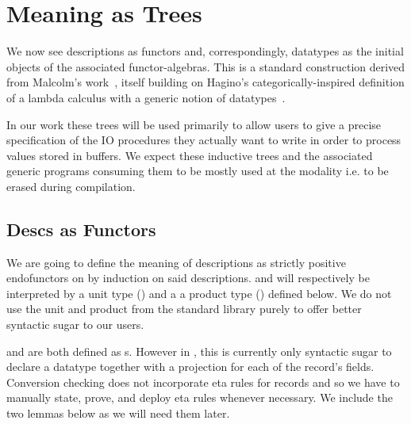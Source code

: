 \section{Meaning as Trees}\label{sec:trees}

We now see descriptions as functors and, correspondingly,
datatypes as the initial objects of the associated functor-algebras.
%
This is a standard construction derived from Malcolm's
work~\citeyearpar{DBLP:journals/scp/Malcolm90},
itself building on Hagino's categorically-inspired
definition of a lambda calculus
with a generic notion of datatypes~\citep{DBLP:conf/ctcs/Hagino87}.

In our work these trees will be used primarily to allow users to
give a precise specification of the IO procedures they actually want
to write in order to process values stored in buffers.
%
We expect these inductive trees and the associated generic programs
consuming them to be mostly used at the 
modality i.e. to be erased during compilation.

\subsection{Descs as Functors}

We are going to define the meaning of descriptions as
strictly positive endofunctors on  by
induction on said descriptions.
%
 and  will respectively
be interpreted by a unit type () and a
a product type () defined below.
%
We do not use the unit and product from the standard
library purely to offer better syntactic sugar to
our users.

\noindent
\begin{minipage}[t]{.4\textwidth}
\end{minipage}\hfill
\begin{minipage}[t]{.5\textwidth}
\end{minipage}

\begin{remark}\label{rmk:etarecords}
   and  are both defined
  as s.
  However in \idris{}, this is currently only syntactic sugar
  to declare a datatype together with a projection for each
  of the record's fields.
  Conversion checking does not incorporate eta rules for records
  and so we have to manually state, prove, and deploy eta rules
  whenever necessary.
  We include the two lemmas below as we will need them later.

\end{remark}

